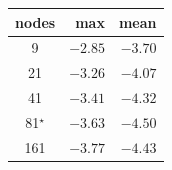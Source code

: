 \begin{tabular}{crr}
\toprule
nodes & max & mean \\
\midrule
9 & $-2.85$ & $-3.70$ \\
21 & $-3.26$ & $-4.07$ \\
41 & $-3.41$ & $-4.32$ \\
81$^\star$ & $-3.63$ & $-4.50$ \\
161 & $-3.77$ & $-4.43$ \\
\bottomrule
\end{tabular}
